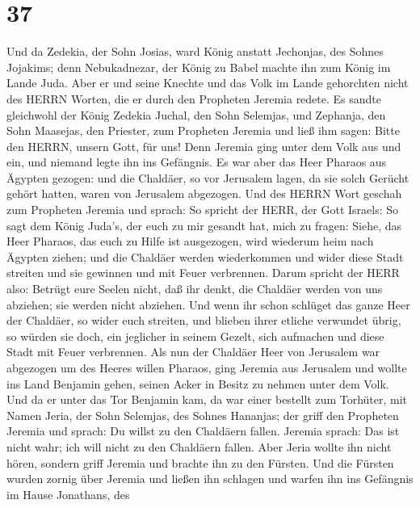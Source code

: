 \hypertarget{section-36}{%
\section{37}\label{section-36}}

 Und da Zedekia, der Sohn Josias, ward König anstatt
Jechonjas, des Sohnes Jojakims; denn Nebukadnezar, der König zu Babel
machte ihn zum König im Lande Juda.  Aber er und seine
Knechte und das Volk im Lande gehorchten nicht des HERRN Worten, die er
durch den Propheten Jeremia redete.  Es sandte gleichwohl
der König Zedekia Juchal, den Sohn Selemjas, und Zephanja, den Sohn
Maasejas, den Priester, zum Propheten Jeremia und ließ ihm sagen: Bitte
den HERRN, unsern Gott, für uns!  Denn Jeremia ging unter
dem Volk aus und ein, und niemand legte ihn ins Gefängnis. 
Es war aber das Heer Pharaos aus Ägypten gezogen: und die Chaldäer, so
vor Jerusalem lagen, da sie solch Gerücht gehört hatten, waren von
Jerusalem abgezogen.  Und des HERRN Wort geschah zum
Propheten Jeremia und sprach:  So spricht der HERR, der Gott
Israels: So sagt dem König Juda's, der euch zu mir gesandt hat, mich zu
fragen: Siehe, das Heer Pharaos, das euch zu Hilfe ist ausgezogen, wird
wiederum heim nach Ägypten ziehen;  und die Chaldäer werden
wiederkommen und wider diese Stadt streiten und sie gewinnen und mit
Feuer verbrennen.  Darum spricht der HERR also: Betrügt eure
Seelen nicht, daß ihr denkt, die Chaldäer werden von uns abziehen; sie
werden nicht abziehen.  Und wenn ihr schon schlüget das
ganze Heer der Chaldäer, so wider euch streiten, und blieben ihrer
etliche verwundet übrig, so würden sie doch, ein jeglicher in seinem
Gezelt, sich aufmachen und diese Stadt mit Feuer verbrennen.
 Als nun der Chaldäer Heer von Jerusalem war abgezogen um
des Heeres willen Pharaos,  ging Jeremia aus Jerusalem und
wollte ins Land Benjamin gehen, seinen Acker in Besitz zu nehmen unter
dem Volk.  Und da er unter das Tor Benjamin kam, da war
einer bestellt zum Torhüter, mit Namen Jeria, der Sohn Selemjas, des
Sohnes Hananjas; der griff den Propheten Jeremia und sprach: Du willst
zu den Chaldäern fallen.  Jeremia sprach: Das ist nicht
wahr; ich will nicht zu den Chaldäern fallen. Aber Jeria wollte ihn
nicht hören, sondern griff Jeremia und brachte ihn zu den Fürsten.
 Und die Fürsten wurden zornig über Jeremia und ließen ihn
schlagen und warfen ihn ins Gefängnis im Hause Jonathans, des
